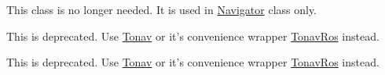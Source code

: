 
\begin{DoxyRefList}
\item[\label{deprecated__deprecated000001}%
\hypertarget{deprecated__deprecated000001}{}%
Class \hyperlink{class_imu_buffer}{Imu\-Buffer} ]This class is no longer needed. It is used in \hyperlink{class_navigator}{Navigator} class only. 
\item[\label{deprecated__deprecated000002}%
\hypertarget{deprecated__deprecated000002}{}%
Class \hyperlink{class_navigator}{Navigator} ]This is deprecated. Use \hyperlink{class_tonav}{Tonav} or it's convenience wrapper \hyperlink{class_tonav_ros}{Tonav\-Ros} instead.  
\item[\label{deprecated__deprecated000003}%
\hypertarget{deprecated__deprecated000003}{}%
Member \hyperlink{class_navigator_a614e53f6cf6859608b14057272003cea}{Navigator\-:\-:run} (int argc, const char $\ast$argv\mbox{[}\mbox{]})]This is deprecated. Use \hyperlink{class_tonav}{Tonav} or it's convenience wrapper \hyperlink{class_tonav_ros}{Tonav\-Ros} instead.
\end{DoxyRefList}